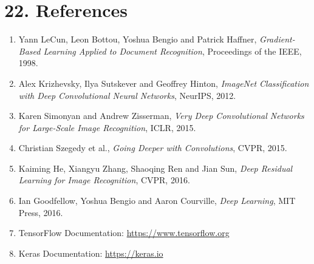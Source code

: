 \documentclass[11pt]{article}
\begin{document}

\section*{22. References}

\begin{enumerate}

\item Yann LeCun, Leon Bottou, Yoshua Bengio and Patrick Haffner,
\emph{Gradient-Based Learning Applied to Document Recognition},
Proceedings of the IEEE, 1998.

\item Alex Krizhevsky, Ilya Sutskever and Geoffrey Hinton,
\emph{ImageNet Classification with Deep Convolutional Neural Networks},
NeurIPS, 2012.

\item Karen Simonyan and Andrew Zisserman,
\emph{Very Deep Convolutional Networks for Large-Scale Image Recognition},
ICLR, 2015.

\item Christian Szegedy et al.,
\emph{Going Deeper with Convolutions},
CVPR, 2015.

\item Kaiming He, Xiangyu Zhang, Shaoqing Ren and Jian Sun,
\emph{Deep Residual Learning for Image Recognition},
CVPR, 2016.

\item Ian Goodfellow, Yoshua Bengio and Aaron Courville,
\emph{Deep Learning},
MIT Press, 2016.

\item TensorFlow Documentation:
\url{https://www.tensorflow.org}

\item Keras Documentation:
\url{https://keras.io}

\end{enumerate}

\end{document}
